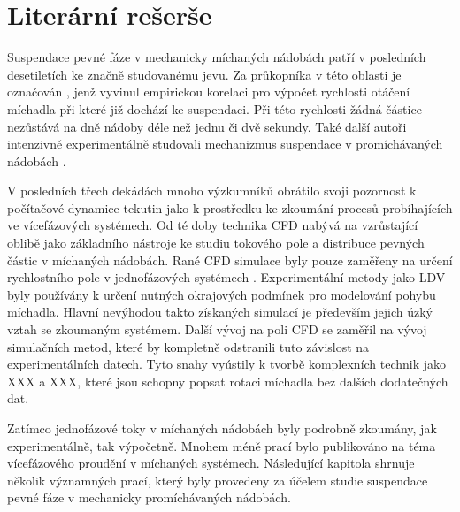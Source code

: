 \chapter{Literární rešerše}
Suspendace pevné fáze v mechanicky míchaných nádobách patří v posledních desetiletích ke značně studovanému jevu. Za průkopníka v této oblasti je označován \citet{zwi58}, jenž vyvinul empirickou korelaci pro výpočet rychlosti otáčení míchadla při které již dochází ke suspendaci. Při této rychlosti žádná částice nezůstává na dně nádoby déle než jednu či dvě sekundy. Také další autoři intenzivně experimentálně studovali mechanizmus suspendace v promíchávaných nádobách \citep{nie68,bal78,arm98}. 

V posledních třech dekádách mnoho výzkumníků obrátilo svoji pozornost k počítačové dynamice tekutin jako k prostředku ke zkoumání procesů probíhajících ve vícefázových systémech. Od té doby technika CFD nabývá na vzrůstající oblibě jako základního nástroje ke studiu tokového pole a distribuce pevných částic v míchaných nádobách. Rané CFD simulace byly pouze zaměřeny na určení rychlostního pole v jednofázových systémech \citep{kre91}. Experimentální metody jako LDV byly používány k určení nutných okrajových podmínek pro modelování pohybu míchadla. Hlavní nevýhodou takto získaných simulací je především jejich úzký vztah se zkoumaným systémem. Další vývoj na poli CFD se zaměřil na vývoj simulačních metod, které by kompletně odstranili tuto závislost na experimentálních datech. Tyto snahy vyústily k tvorbě komplexních technik jako XXX a XXX, které jsou schopny popsat rotaci míchadla bez dalších dodatečných dat.  

Zatímco jednofázové toky v míchaných nádobách byly podrobně zkoumány, jak experimentálně, tak výpočetně. Mnohem méně prací bylo publikováno na téma vícefázového proudění v míchaných systémech. Následující kapitola shrnuje několik významných prací, který byly provedeny za účelem studie suspendace pevné fáze v mechanicky promíchávaných nádobách.
  
